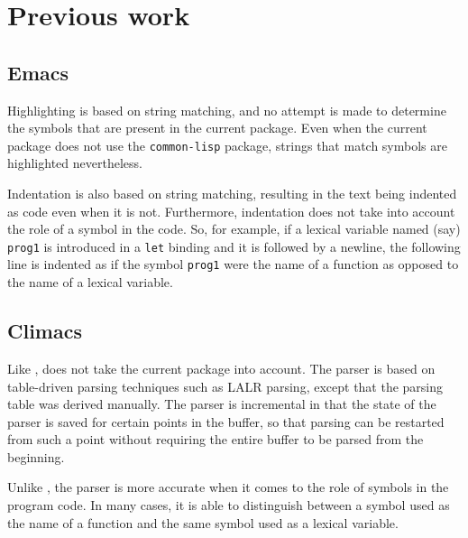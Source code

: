 \section{Previous work}

\subsection{Emacs}

Highlighting is based on string matching, and no attempt is made to
determine the symbols that are present in the current package.
Even when the current package does not use the \texttt{common-lisp}
package, strings that match \commonlisp{} symbols are highlighted
nevertheless.

Indentation is also based on string matching, resulting in the text
being indented as \commonlisp{} code even when it is not.
Furthermore, indentation does not take into account the role of a
symbol in the code.  So, for example, if a lexical variable named
(say) \texttt{prog1} is introduced in a \texttt{let} binding and
it is followed by a newline, the following line is indented as if the
symbol \texttt{prog1} were the name of a \commonlisp{} function as
opposed to the name of a lexical variable.

\subsection{Climacs}

Like \emacs{}, \climacs{} does not take the current package into
account.  The parser is based on table-driven parsing techniques
such as LALR parsing, except that the parsing table was derived
manually.  The parser is incremental in that the state of the parser
is saved for certain points in the buffer, so that parsing can be
restarted from such a point without requiring the entire buffer to be
parsed from the beginning.

Unlike \emacs{}, the \climacs{} parser is more accurate when it comes
to the role of symbols in the program code.  In many cases, it is able
to distinguish between a symbol used as the name of a function and the
same symbol used as a lexical variable.
